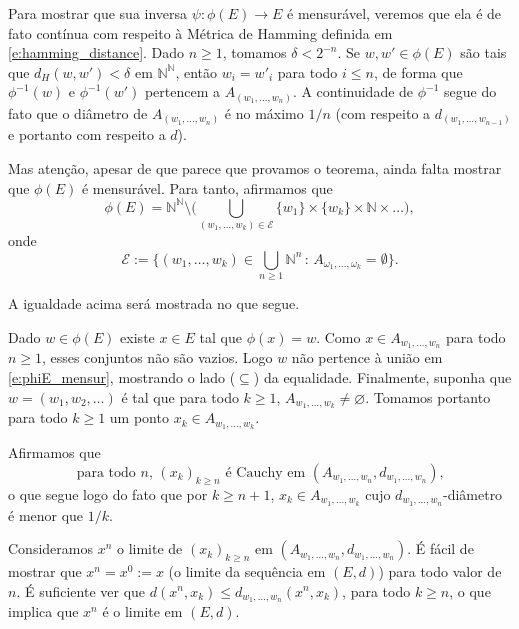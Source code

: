   Para mostrar que sua inversa $\psi:\phi(E) \to E$ é mensurável, veremos que ela é de fato contínua com respeito à Métrica de Hamming definida em \eqref{e:hamming_distance}.
  Dado $n \geq 1$, tomamos $\delta < 2^{-n}$.
  Se $w, w' \in \phi(E)$ são tais que $d_H(w, w') < \delta$ em $\mathbb{N}^\mathbb{N}$, então $w_i = w'_i$ para todo $i \leq n$, de forma que $\phi^{-1}(w)$ e $\phi^{-1}(w')$ pertencem a $A_{(w_1, \dots, w_n)}$.
  A continuidade de $\phi^{-1}$ segue do fato que o diâmetro de $A_{(w_1, \dots, w_n)}$ é no máximo $1/n$ (com respeito a $d_{(w_1, \dots, w_{n-1})}$ e portanto com respeito a $d$).

  Mas atenção, apesar de que parece que provamos o teorema, ainda falta mostrar que $\phi(E)$ é mensurável.
  Para tanto, afirmamos que
  \begin{equation}
    \label{e:phiE_mensur}
    \phi(E) = \mathbb{N}^\mathbb{N} \setminus \Big( \bigcup_{(w_1, \dots, w_k)\in \mathcal{E}} \{w_1\} \times \{w_k\} \times \mathbb{N} \times \dots \Big),
  \end{equation}
  onde
  \begin{equation*}
   \mathcal{E}:=\{ (w_1, \dots, w_k)\in \bigcup_{n\ge 1} \mathbb{N}^n \, : \, A_{\omega_1,\dots,\omega_k}=\emptyset \}.
  \end{equation*}

  A igualdade acima será mostrada no que segue.

  Dado $w \in \phi(E)$ existe $x \in E$ tal que $\phi(x) = w$.
  Como $x \in A_{w_1, \dots, w_n}$ para todo $n \geq 1$, esses conjuntos não são vazios.
  Logo $w$ não pertence à união em \eqref{e:phiE_mensur}, mostrando o lado ($\subseteq$) da equalidade.
  Finalmente, suponha que $w = (w_1, w_2, \dots)$ é tal que para todo $k \geq 1$, $A_{w_1, \dots, w_k} \neq \varnothing$.
  Tomamos portanto para todo $k \geq 1$ um ponto $x_k \in A_{w_1, \dots, w_k}$.

  Afirmamos que
  \begin{equation}
    \text{para todo $n$, $(x_k)_{k \geq n}$ é Cauchy em $(A_{w_1, \dots, w_n}, d_{w_1, \dots, w_n})$,}
  \end{equation}
 o que segue logo do fato que por $k \geq n+1$, $x_k \in A_{w_1, \dots, w_{k}}$ cujo $d_{w_1, \dots, w_{n}}$-diâmetro é menor que $1/k$.

 \medskip

 Consideramos $x^n$ o limite de $(x_k)_{k\ge n}$ em $(A_{w_1, \dots, w_n}, d_{w_1, \dots, w_n})$.
 É fácil de mostrar que $x^n=x^0:=x$ (o limite da sequência em $(E,d)$) para todo valor de $n$.
 É suficiente ver que  $d(x^n,x_k)\le d_{w_1, \dots, w_n}(x^n,x_k)$, para todo $k\ge n$, o que implica que $x^n$ é o limite em $(E,d)$.

